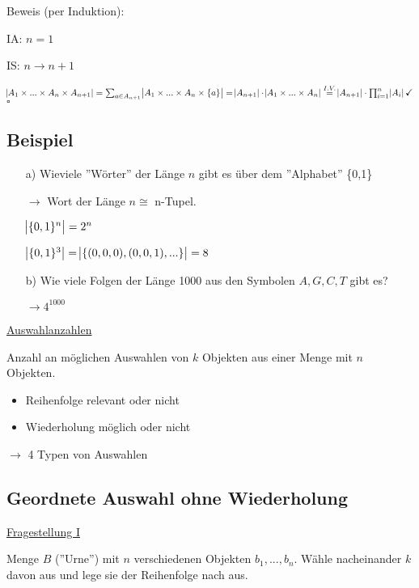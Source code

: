 \documentclass[a4paper, 12pt, twoside] {article}
\begin{document}
Beweis (per Induktion):

IA: $n=1$ \checkmark

IS: $n \to n+1$

$\abs{A_1 \times ... \times A_n \times A_{n+1}} = \sum_{a \in A_{n+1}} \abs{A_1 \times ... \times A_n \times \{a\}} = \abs{A_{n+1}} \cdot \abs{A_1 \times ... \times A_n} \overset{I.V.}{=} \abs{A_{n+1}} \cdot \prod_{i=1}^n \abs{A_i} \checkmark$ \hfill $\square$

\subsection{Beispiel} %

\begin{itemize}
\item[a)] Wieviele ''Wörter'' der Länge $n$ gibt es über dem ''Alphabet'' \{0,1\}

$\to$ Wort der Länge $n \cong $ n-Tupel.

$\abs{\{0,1\}^n} = 2^n$

$\abs{\{0,1\}^3} = \abs{\{(0,0,0),(0,0,1),...\}} = 8$

\item[b)] Wie viele Folgen der Länge 1000 aus den Symbolen $A,G,C,T$ gibt es?

$\to 4^{1000}$

\end{itemize}

\uline{Auswahlanzahlen}

Anzahl an möglichen Auswahlen von $k$ Objekten aus einer Menge mit $n$ Objekten.



\begin{itemize}
\item Reihenfolge relevant oder nicht
\item Wiederholung möglich oder nicht
\end{itemize}
$\to$ 4 Typen von Auswahlen

\subsection{Geordnete Auswahl ohne Wiederholung} %

\underline{Fragestellung I}

Menge $B$ (''Urne'') mit $n$ verschiedenen Objekten $b_1,...,b_n$. Wähle nacheinander $k$ davon aus und lege sie der Reihenfolge nach aus.
\end{document}
